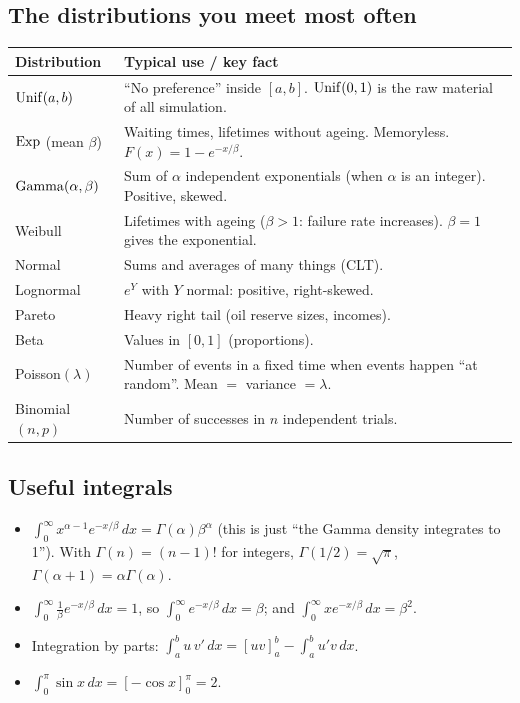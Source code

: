 \subsection{The distributions you meet most often}
\begin{center}
\begin{tabularx}{\textwidth}{lX}
\toprule
Distribution & Typical use / key fact \\
\midrule
$\mathrm{Unif}(a,b)$ & ``No preference'' inside $[a,b]$. $\mathrm{Unif}(0,1)$ is the raw material of all simulation. \\
$\mathrm{Exp}$ (mean $\beta$) & Waiting times, lifetimes without ageing. Memoryless. $F(x) = 1-e^{-x/\beta}$. \\
$\mathrm{Gamma}(\alpha,\beta)$ & Sum of $\alpha$ independent exponentials (when $\alpha$ is an integer). Positive, skewed. \\
Weibull & Lifetimes with ageing ($\beta>1$: failure rate increases). $\beta = 1$ gives the exponential. \\
Normal & Sums and averages of many things (CLT). \\
Lognormal & $e^{Y}$ with $Y$ normal: positive, right-skewed. \\
Pareto & Heavy right tail (oil reserve sizes, incomes). \\
Beta & Values in $[0,1]$ (proportions). \\
Poisson$(\lambda)$ & Number of events in a fixed time when events happen ``at random''. Mean $=$ variance $=\lambda$. \\
Binomial$(n,p)$ & Number of successes in $n$ independent trials. \\
\bottomrule
\end{tabularx}
\end{center}

\subsection{Useful integrals}
\begin{itemize}
  \item $\int_0^\infty x^{\alpha-1}e^{-x/\beta}\,dx = \Gamma(\alpha)\beta^\alpha$ (this is just ``the Gamma density integrates to 1''). With $\Gamma(n) = (n-1)!$ for integers, $\Gamma(1/2) = \sqrt{\pi}$, $\Gamma(\alpha+1) = \alpha\Gamma(\alpha)$.
  \item $\int_0^\infty \frac{1}{\beta}e^{-x/\beta}\,dx = 1$, so $\int_0^\infty e^{-x/\beta}\,dx = \beta$; and $\int_0^\infty x e^{-x/\beta}\,dx = \beta^2$.
  \item Integration by parts: $\int_a^b u\,v'\,dx = [uv]_a^b - \int_a^b u'v\,dx$.
  \item $\int_0^\pi \sin x\,dx = [-\cos x]_0^\pi = 2$.
\end{itemize}

